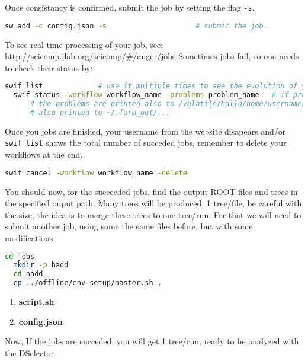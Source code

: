 \documentclass{article}
\begin{document}
Once consistancy is confirmed, submit the job by setting the flag \texttt{-s}.

\begin{lstlisting}[language=bash]
  sw add -c config.json -s                     # submit the job.
\end{lstlisting}

To see real time processing of your job, see: \url{http://scicomp.jlab.org/scicomp/#/auger/jobs}
Sometimes jobs fail, so one needs to check their status by:

\begin{lstlisting}[language=bash]
  swif list             # use it multiple times to see the evolution of your jobs
  swif status -workflow workflow_name -problems problem_name   # if problems appear, check their source.
      # the problems are printed also to /volatile/halld/home/username/ana/Y2175/log/...
      # also printed to ~/.farm_out/...
\end{lstlisting}

Once you jobs are finished, your username from the website disapears and/or \texttt{swif list} shows the total number of succeded jobs, remember to delete your workflows at the end.

\begin{lstlisting}[language=bash]
  swif cancel -workflow workflow_name -delete
\end{lstlisting}

You should now, for the succeeded jobs, find the output ROOT files and trees in the specified ouput path.
Many trees will be produced, 1 tree/file, be careful with the size, the idea is to merge these trees to one tree/run.
For that we will need to submit another job, using some the same files before, but with some modifications:

\begin{lstlisting}[language=bash]
  cd jobs
  mkdir -p hadd
  cd hadd
  cp ../offline/env-setup/master.sh .
\end{lstlisting}

\begin{enumerate}
\item \textbf{script.sh}
  
\item \textbf{config.json}
  
\end{enumerate}

Now, If the jobs are succeded, you will get 1 tree/run, ready to be analyzed with the DSelector 
\end{document}
